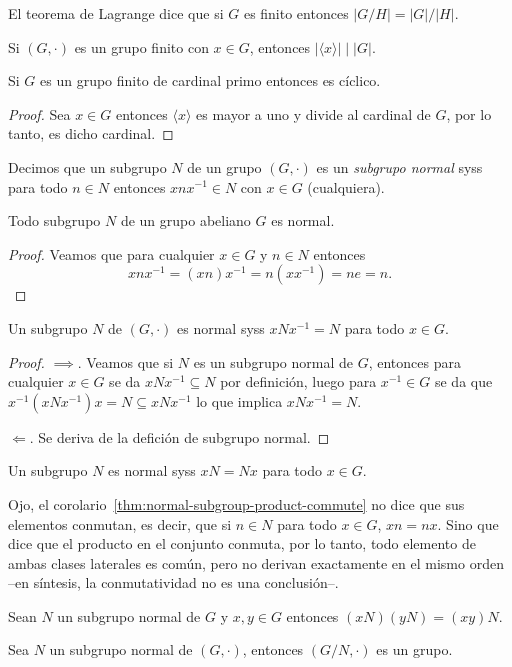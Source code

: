 \documentclass[11pt,oneside]{book}
\begin{document}
El teorema de Lagrange dice que si $G$ es finito entonces $|G/H|=|G|/|H|$.
\begin{cor}
Si $(G,\cdot)$ es un grupo finito con $x\in G$, entonces $|\langle x\rangle|\mid|G|$.
\end{cor}
\begin{cor}
Si $G$ es un grupo finito de cardinal primo entonces es cíclico.
\end{cor}
\begin{proof}
Sea $x\in G$ entonces $\langle x\rangle$ es mayor a uno y divide al cardinal de $G$, por lo tanto, es dicho cardinal.
\end{proof}
\begin{mydef}
Decimos que un subgrupo $N$ de un grupo $(G,\cdot)$ es un \textit{subgrupo normal} syss para todo $n\in N$ entonces $xnx^{-1}\in N$ con $x\in G$ (cualquiera).
\end{mydef}
\begin{thm}
Todo subgrupo $N$ de un grupo abeliano $G$ es normal.
\end{thm}
\begin{proof}
Veamos que para cualquier $x\in G$ y $n\in N$ entonces
$$xnx^{-1}=(xn)x^{-1}=n(xx^{-1})=ne=n.$$
\end{proof}
\begin{thm}
Un subgrupo $N$ de $(G,\cdot)$ es normal syss $xNx^{-1}=N$ para todo $x\in G$. 
\end{thm}
\begin{proof}
$\implies$. Veamos que si $N$ es un subgrupo normal de $G$, entonces para cualquier $x\in G$ se da $xNx^{-1}\subseteq N$ por definición, luego para $x^{-1}\in G$ se da que $x^{-1}(xNx^{-1})x=N\subseteq xNx^{-1}$ lo que implica $xNx^{-1}=N$.

$\Longleftarrow$. Se deriva de la defición de subgrupo normal.
\end{proof}
\begin{cor}\label{thm:normal-subgroup-product-commute}
Un subgrupo $N$ es normal syss $xN=Nx$ para todo $x\in G$.
\end{cor}
Ojo, el corolario~\ref{thm:normal-subgroup-product-commute} no dice que sus elementos conmutan, es decir, que si $n\in N$ para todo $x\in G$, $xn=nx$. Sino que dice que el producto en el conjunto conmuta, por lo tanto, todo elemento de ambas clases laterales es común, pero no derivan exactamente en el mismo orden --en síntesis, la conmutatividad no es una conclusión--.
\begin{thm}
Sean $N$ un subgrupo normal de $G$ y $x,y\in G$ entonces $(xN)(yN)=(xy)N$.
\end{thm}
\begin{prop}\label{thm:quotient-group-structure}
Sea $N$ un subgrupo normal de $(G,\cdot)$, entonces $(G/N,\cdot)$ es un grupo.
\end{prop}
\end{document}
